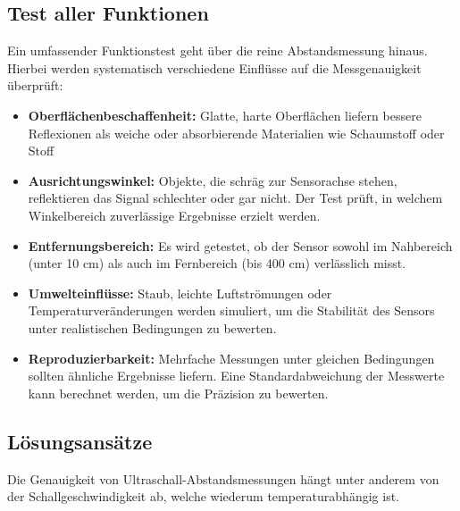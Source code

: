 \subsection{Test aller Funktionen}
Ein umfassender Funktionstest geht über die reine Abstandsmessung hinaus. Hierbei werden
systematisch verschiedene Einflüsse auf die Messgenauigkeit überprüft: \cite{Hering:2023}
\begin{itemize}
	\item \textbf{Oberflächenbeschaffenheit:} Glatte, harte Oberflächen liefern bessere Reflexionen als
	weiche oder absorbierende Materialien wie Schaumstoff oder Stoff
	\item \textbf{Ausrichtungswinkel:} Objekte, die schräg zur Sensorachse stehen, reflektieren das
	Signal schlechter oder gar nicht. Der Test prüft, in welchem Winkelbereich zuverlässige
	Ergebnisse erzielt werden.
	\item \textbf{Entfernungsbereich:} Es wird getestet, ob der Sensor sowohl im Nahbereich (unter
	10 cm) als auch im Fernbereich (bis 400 cm) verlässlich misst.
	\item \textbf{Umwelteinflüsse:} Staub, leichte Luftströmungen oder Temperaturveränderungen
	werden simuliert, um die Stabilität des Sensors unter realistischen Bedingungen zu
	bewerten.
	\item \textbf{Reproduzierbarkeit:} Mehrfache Messungen unter gleichen Bedingungen sollten
	ähnliche Ergebnisse liefern. Eine Standardabweichung der Messwerte kann berechnet
	werden, um die Präzision zu bewerten.
\end{itemize}

\subsection{Lösungsansätze}

Die Genauigkeit von Ultraschall-Abstandsmessungen hängt unter anderem von der Schallgeschwindigkeit ab, welche wiederum temperaturabhängig ist. 

